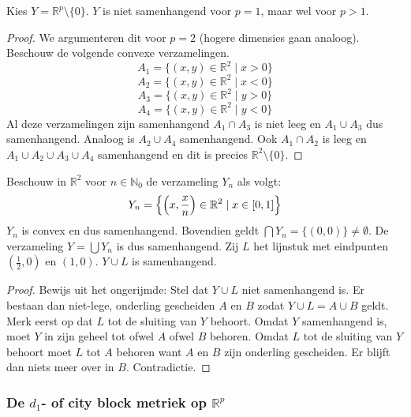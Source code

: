 \documentclass[main.tex]{subfiles}
\begin{document}
\begin{vb}
  Kies $Y = \mathbb{R}^{p} \setminus \{0\}$.
  $Y$ is niet samenhangend voor $p=1$, maar wel voor $p>1$.

  \begin{proof}
    We argumenteren dit voor $p=2$ (hogere dimensies gaan analoog).
    Beschouw de volgende convexe verzamelingen.
    \[ A_{1} = \{(x,y) \in \mathbb{R}^{2} \mid x > 0 \} \]
    \[ A_{2} = \{(x,y) \in \mathbb{R}^{2} \mid x < 0 \} \]
    \[ A_{3} = \{(x,y) \in \mathbb{R}^{2} \mid y > 0 \} \]
    \[ A_{4} = \{(x,y) \in \mathbb{R}^{2} \mid y < 0 \} \]
    Al deze verzamelingen zijn samenhangend 
    $A_{1} \cap A_{3}$ is niet leeg en $A_{1} \cup A_{3}$ dus samenhangend.
    Analoog is $A_{2} \cup A_{4}$ samenhangend.
    Ook $A_{1} \cap A_{2}$ is leeg en $A_{1} \cup A_{2} \cup A_{3} \cup A_{4}$ samenhangend en dit is precies $\mathbb{R}^{2} \setminus \{0\}$.
  \end{proof}
\end{vb}

\begin{vb}
  Beschouw in $\mathbb{R}^{2}$ voor $n\in \mathbb{N}_{0}$ de verzameling $Y_{n}$ als volgt:
  \[ Y_{n} = \left\{ \left( x,\frac{x}{n} \right) \in \mathbb{R}^{2} \mid x\in \interval{0}{1} \right\} \]
  $Y_{n}$ is convex en dus samenhangend.
  Bovendien geldt $\bigcap Y_{n} = \{(0,0)\} \neq \emptyset$.
  De verzameling $Y = \bigcup Y_{n}$ is dus samenhangend.
  Zij $L$ het lijnstuk met eindpunten $\left(\frac{1}{2},0\right)$ en $(1,0)$.
  $Y\cup L$ is samenhangend.
  
  \begin{proof}
    Bewijs uit het ongerijmde: Stel dat $Y \cup L$ niet samenhangend is.
    Er bestaan dan niet-lege, onderling gescheiden $A$ en $B$ zodat $Y\cup L = A \cup B$ geldt.
    Merk eerst op dat $L$ tot de sluiting van $Y$ behoort.
    Omdat $Y$ samenhangend is, moet $Y$ in zijn geheel tot ofwel $A$ ofwel $B$ behoren.
    Omdat $L$ tot de sluiting van $Y$ behoort moet $L$ tot $A$ behoren want $A$ en $B$ zijn onderling gescheiden.
    Er blijft dan niets meer over in $B$.
    Contradictie.
  \end{proof}
\end{vb}


\subsubsection{De $d_1$- of city block metriek op $\mathbb{R}^p$}
\label{sec:de-d_1-city}
\end{document}
